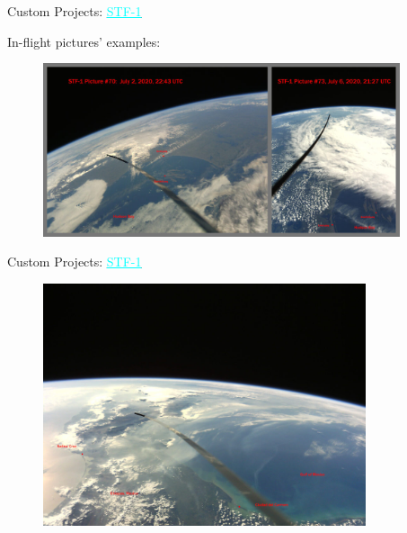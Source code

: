 \begin{frame}{Custom Projects: \href{http://stf1.com/}{\textcolor{cyan}{\underline{STF-1}}}}

    In-flight pictures' examples:

    \begin{figure}[!ht]
        \begin{center}
            \includegraphics[width=10.5cm]{figures/stf-1-ex1.jpg}
        \end{center}
    \end{figure}

\end{frame}

\begin{frame}{Custom Projects: \href{http://stf1.com/}{\textcolor{cyan}{\underline{STF-1}}}}

    \begin{figure}[!ht]
        \begin{center}
            \includegraphics[width=9.5cm]{figures/stf-1-ex2.jpg}
        \end{center}
    \end{figure}

\end{frame}

